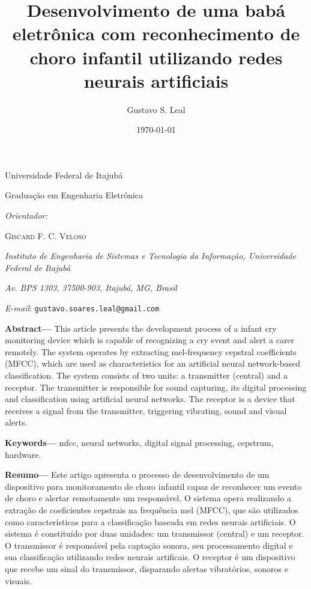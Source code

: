 \documentclass[10pt,a4paper]{article}
\title{Desenvolvimento de uma babá eletrônica com reconhecimento de choro infantil utilizando redes neurais artificiais}
\author{Gustavo S. Leal}
\date{\today}
\begin{document}
\begin{center}

{\large Universidade Federal de Itajubá}

{\scriptsize Graduação em Engenharia Eletrônica}

\vspace{1.25cm}

\textsc{\textbf{\@title}}	
\vspace{0.5cm}

\textsc{\@author}

\vspace{0.35cm}

\textit{Orientador:}

\textsc{Giscard F. C. Veloso}

\vspace{0.75cm}
\textit{Instituto de Engenharia de Sistemas e Tecnologia da Informação, Universidade Federal de Itajubá}

\textit{Av. BPS 1303, 37500-903, Itajubá, MG, Brasil}

\textit{E-mail}: \texttt{gustavo.soares.leal@gmail.com}
\end{center}

\vspace{0.75cm}

{\footnotesize \textbf{Abstract---} 
This article presents the development process of a infant cry monitoring device which is capable of recognizing a cry event and alert a carer remotely. The system operates by extracting mel-frequency cepstral coefficients (MFCC), which are used as characteristics for an artificial neural network-based classification. The system consists of two units: a transmitter (central) and a receptor. The transmitter is responsible for sound capturing, its digital processing and classification using artificial neural networks. The receptor is a device that receives a signal from the transmitter, triggering vibrating, sound and visual alerts.
}
\vspace{0.35cm}

{\footnotesize \textbf{Keywords---} mfcc, neural networks, digital signal processing, cepstrum, hardware.}
\vspace{0.35cm}

{\footnotesize \textbf{Resumo---}
Este artigo apresenta o processo de desenvolvimento de um dispositivo para monitoramento de choro infantil capaz de reconhecer um evento de choro e alertar remotamente um responsável. O sistema opera realizando a extração de coeficientes cepstrais na frequência mel (MFCC), que são utilizados como características para a classificação baseada em redes neurais artificiais. O sistema é constituído por duas unidades: um transmissor (central) e um receptor. O transmissor é responsável pela captação sonora, seu processamento digital e sua classificação utilizando redes neurais artificais. O receptor é um dispositivo que recebe um sinal do transmissor, disparando alertas vibratórios, sonoros e visuais.}
\end{document}
